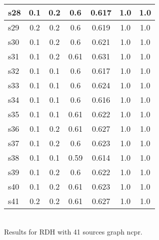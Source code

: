 \documentclass{article}
\begin{document}
\begin{tabular}{|l|c|c|c|c|c|c|}
\hline
s28 &0.1 & 0.2 & 0.6 & 0.617 & 1.0 & 1.0\\
\hline
s29 &0.2 & 0.2 & 0.6 & 0.619 & 1.0 & 1.0\\
\hline
s30 &0.1 & 0.2 & 0.6 & 0.621 & 1.0 & 1.0\\
\hline
s31 &0.1 & 0.2 & 0.61 & 0.631 & 1.0 & 1.0\\
\hline
s32 &0.1 & 0.1 & 0.6 & 0.617 & 1.0 & 1.0\\
\hline
s33 &0.1 & 0.1 & 0.6 & 0.624 & 1.0 & 1.0\\
\hline
s34 &0.1 & 0.1 & 0.6 & 0.616 & 1.0 & 1.0\\
\hline
s35 &0.1 & 0.1 & 0.61 & 0.622 & 1.0 & 1.0\\
\hline
s36 &0.1 & 0.2 & 0.61 & 0.627 & 1.0 & 1.0\\
\hline
s37 &0.1 & 0.2 & 0.6 & 0.623 & 1.0 & 1.0\\
\hline
s38 &0.1 & 0.1 & 0.59 & 0.614 & 1.0 & 1.0\\
\hline
s39 &0.1 & 0.2 & 0.6 & 0.622 & 1.0 & 1.0\\
\hline
s40 &0.1 & 0.2 & 0.61 & 0.623 & 1.0 & 1.0\\
\hline
s41 &0.2 & 0.2 & 0.61 & 0.627 & 1.0 & 1.0\\
\hline
\end{tabular}\\

\noindent Results for RDH with 41 sources graph ncpr.
\end{document}
